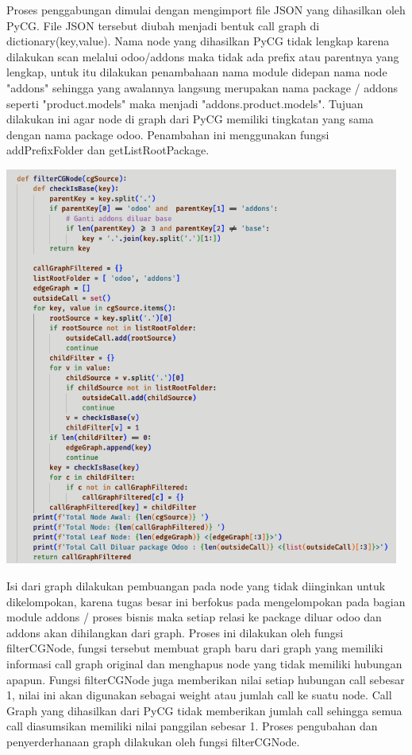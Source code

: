 Proses penggabungan dimulai dengan mengimport file JSON yang dihasilkan oleh PyCG. File JSON tersebut diubah menjadi bentuk call graph di dictionary(key,value). Nama node yang dihasilkan PyCG tidak lengkap karena dilakukan scan melalui odoo/addons maka tidak ada prefix atau parentnya yang lengkap, untuk itu dilakukan penambahaan nama module didepan nama node "addons" sehingga yang awalannya langsung merupakan nama package / addons seperti "product.models" maka menjadi "addons.product.models". Tujuan dilakukan ini agar node di graph dari PyCG memiliki tingkatan yang sama dengan nama package odoo. Penambahan ini menggunakan fungsi addPrefixFolder dan getListRootPackage.

\begin{center}
	\includegraphics[width=13cm]{img/bab_4/ekstraksi_2.png}
	\label{fig:ekstraksi_2}
\end{center}

Isi dari graph dilakukan pembuangan pada node yang tidak diinginkan untuk dikelompokan, karena tugas besar ini berfokus pada mengelompokan pada bagian module addons / proses bisnis maka setiap relasi ke package diluar  odoo dan addons akan dihilangkan dari graph. Proses ini dilakukan oleh fungsi filterCGNode, fungsi tersebut membuat graph baru dari graph yang memiliki informasi call graph original dan menghapus node yang tidak memiliki hubungan apapun. Fungsi filterCGNode juga memberikan nilai setiap hubungan call sebesar 1, nilai ini akan digunakan sebagai weight atau jumlah call ke suatu node. Call Graph yang dihasilkan dari PyCG tidak memberikan jumlah call sehingga semua call diasumsikan memiliki nilai panggilan sebesar 1. Proses pengubahan dan penyerderhanaan graph dilakukan oleh fungsi filterCGNode.

